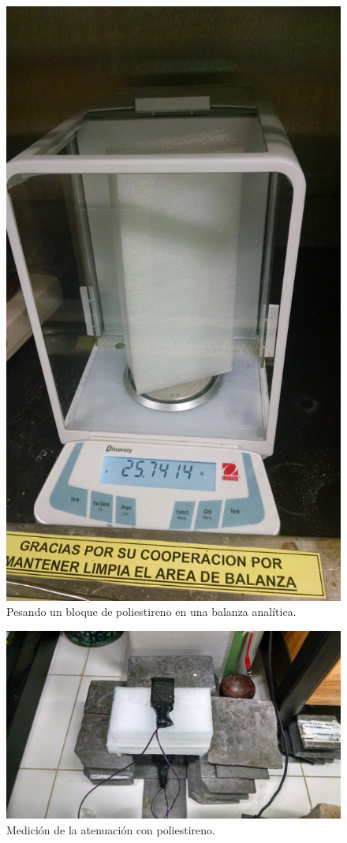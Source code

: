 \documentclass[a4paper,10pt]{article}
\numberwithin{equation}{section}
\begin{document}
\begin{figure}[H]
 \center 
 \includegraphics[scale=0.07]{Imagenes/pesoPoliestireno}
 \caption{Pesando un bloque de poliestireno en una balanza analítica.}
\end{figure}

\begin{figure}[H]
 \center 
 \includegraphics[scale=0.09]{Imagenes/poliestireno1}
 \caption{Medición de la atenuación con poliestireno.}
\end{figure}
\end{document}

